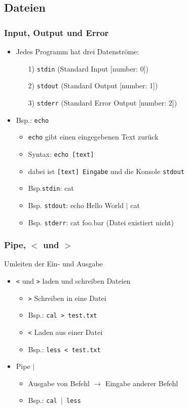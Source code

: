 \documentclass[12pt,utf8]{beamer}
\begin{document}
\subsection{Dateien}
\begin{frame}
\frametitle{Input, Output und Error}
\begin{itemize}
	\item Jedes Programm hat drei Datenströme:
	\begin{itemize}
		\item[1)] \texttt{stdin} (Standard Input [number: 0])
		\item[2)] \texttt{stdout} (Standard Output [number: 1])
		\item[3)] \texttt{stderr} (Standard Error Output [number: 2])
	\end{itemize}
	\item Bsp.: \texttt{echo}
	\begin{itemize}[<+->]
		\item \texttt{echo} gibt einen eingegebenen Text zurück
		\item Syntax: \texttt{echo [text]}
		\item dabei ist \texttt{[text] Eingabe} und die Konsole \texttt{stdout}
		\item Bsp.\texttt{stdin}: cat
		\item Bsp. \texttt{stdout}: echo Hello World \texttt{$\mid$} cat
		\item Bsp. \texttt{stderr}: cat foo.bar (Datei existiert nicht)
	\end{itemize}
\end{itemize}
\end{frame}

\begin{frame}
\frametitle{Pipe, $<$ und $>$ }
Umleiten der Ein- und Ausgabe
\begin{itemize}
	\item \texttt{<} und \texttt{>} laden und schreiben Dateien
	\begin{itemize}[<+->]
		\item \texttt{>} Schreiben in eine Datei
		\item Bsp.: \texttt{cal > test.txt}
		\item \texttt{<} Laden aus einer Datei
		\item Bsp.: \texttt{less < test.txt}
	\end{itemize}
	\item Pipe \texttt{$\mid$}
	\begin{itemize}[<+->]
		\item Ausgabe von Befehl $\to$ Eingabe anderer Befehl
		\item Bsp.: \texttt{cal $\mid$ less}
	\end{itemize}
\end{itemize}
\end{frame}
\end{document}
